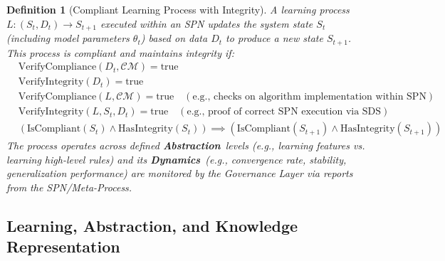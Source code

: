 \documentclass[12pt,a4paper]{report}
\newtheorem{definition}{Definition}[section]
\newcommand{\Abstraction}{\textbf{Abstraction}}
\newcommand{\Dynamics}{\textbf{Dynamics}}
\begin{document}
	\begin{definition}[Compliant Learning Process with Integrity]
		\label{def:compliant_learning}
		A learning process $L: (S_t, D_t) \rightarrow S_{t+1}$ executed within an SPN updates the system state $S_t$ (including model parameters $\theta_t$) based on data $D_t$ to produce a new state $S_{t+1}$. This process is compliant and maintains integrity if:
		\begin{align}
			&\text{VerifyCompliance}(D_t, \mathcal{CM}) = \text{true} \label{eq:learn_data_comp} \\
			&\text{VerifyIntegrity}(D_t) = \text{true} \label{eq:learn_data_int} \\
			&\text{VerifyCompliance}(L, \mathcal{CM}) = \text{true} \quad (\text{e.g., checks on algorithm implementation within SPN}) \label{eq:learn_algo_comp} \\
			&\text{VerifyIntegrity}(L, S_t, D_t) = \text{true} \quad (\text{e.g., proof of correct SPN execution via SDS}) \label{eq:learn_algo_int} \\
			&(\text{IsCompliant}(S_t) \land \text{HasIntegrity}(S_t)) \implies (\text{IsCompliant}(S_{t+1}) \land \text{HasIntegrity}(S_{t+1})) \label{eq:learn_state_preservation}
		\end{align}
		The process operates across defined \Abstraction\ levels (e.g., learning features vs. learning high-level rules) and its \Dynamics\ (e.g., convergence rate, stability, generalization performance) are monitored by the Governance Layer via reports from the SPN/Meta-Process.
	\end{definition}
	
	\subsection{Learning, Abstraction, and Knowledge Representation}
	\label{sec:2-5-2-new}
	
\end{document}
